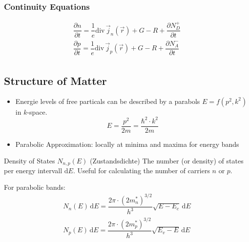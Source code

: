 \subsubsection{Continuity Equations}
\begin{align*}
  \dfrac{\partial n}{\partial t} = \dfrac{1}{e} \mathrm{div}\,\vec{j}_{n}(\vec{r}) + G - R + \dfrac{\partial N_{D}^{+}}{\partial t}\\
  \dfrac{\partial p}{\partial t} = \dfrac{1}{e} \mathrm{div}\,\vec{j}_{p}(\vec{r}) + G - R + \dfrac{\partial N_{A}^{-}}{\partial t}\\
\end{align*}

\subsection{Structure of Matter}
\begin{itemize}
  \item Energie levels of free particals can be described by a parabols $E = f(p^{2}, k^{2})$ in $k$-space.
        \begin{equation*}
          E = \dfrac{p^{2}}{2m} = \dfrac{\hbar^{2}\cdot k^{2}}{2m}
        \end{equation*}
  \item Parabolic Approximation: locally at minima and maxima for energy bands
\end{itemize}

\begin{definition}{Density of States $N_{n,p}(E)$ (Zustandsdichte)}
  The number (or density) of states per energy intervall $\mathrm{d}E$. Useful for calculating the number of carriers $n$ or $p$.

  For parabolic bands:
  \begin{align*}
    N_{n}(E) \, \mathrm{d}E = \dfrac{2\pi \cdot {(2m_{n}^{*})}^{3/2}}{h^{3}} \sqrt{E - E_{c}} \, \mathrm{d}E\\
    N_{p}(E) \, \mathrm{d}E = \dfrac{2\pi \cdot {(2m_{p}^{*})}^{3/2}}{h^{3}} \sqrt{E_{v} - E} \, \mathrm{d}E\\
  \end{align*}
\end{definition}

